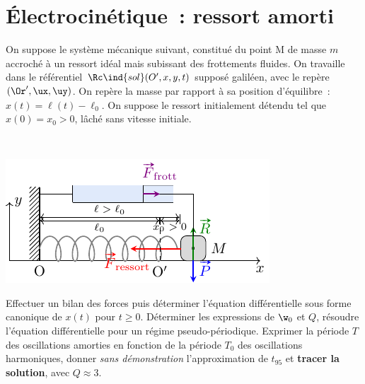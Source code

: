 \documentclass[a4paper, 10pt, final, garamond]{book}
\begin{document}
\setcounter{chapter}{5}

\chapter{Électrocinétique~: ressort amorti}

\begin{enumerate}[label=\sqenumi, leftmargin=10pt]
	\noindent
	\begin{minipage}[t]{.65\linewidth}
		On suppose le système mécanique suivant, constitué du point M de masse $m$
		accroché à un ressort idéal mais subissant des frottements fluides. On
		travaille dans le référentiel $\Rc\ind{sol}(O',x,y,t)$ supposé galiléen,
		avec le repère $(\Or', \ux, \uy)$. On repère la masse par rapport à sa
		position d'équilibre~: $x (t) = \ell(t) - \ell_0$. On suppose le ressort
		initialement détendu tel que $x (0) = x_0 > 0$, lâché sans vitesse initiale.
	\end{minipage}
	\hfill
	\begin{minipage}[t]{.32\linewidth}
		~
		\vspace{-35pt}
		\begin{center}
			\includegraphics[width=\linewidth]{ressort_amorti}
		\end{center}
	\end{minipage}
	Effectuer un bilan des forces puis déterminer l'équation différentielle sous
	forme canonique de $x (t)$ pour $t \geq 0$. Déterminer les expressions de
	$\w_0$ et $Q$, résoudre l'équation différentielle pour un régime
	pseudo-périodique.
	\smallbreak
	Exprimer la période $T$ des oscillations amorties en fonction de la période
	$T_0$ des oscillations harmoniques, donner \textit{sans démonstration}
	l'approximation de $t_{95}$ et \textbf{tracer la solution}, avec $Q \approx
		3$.
	\smallbreak
	\begin{isd}[sidebyside align=top]

\end{isd}
\end{enumerate}
\end{document}
